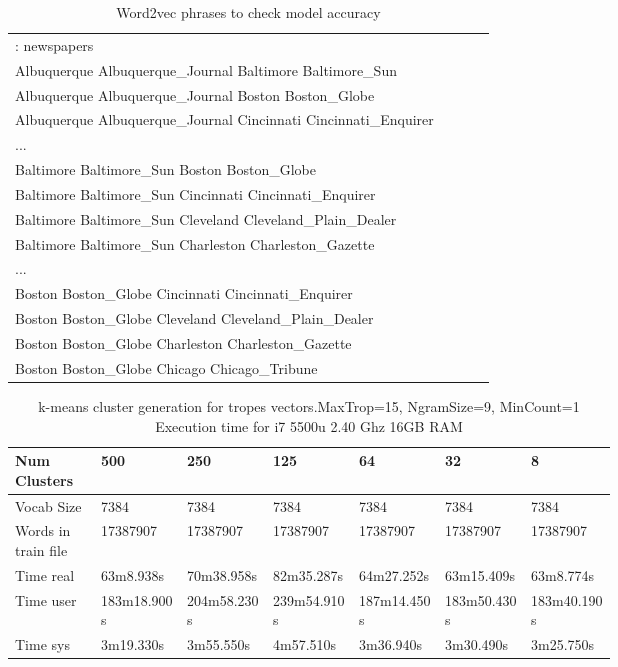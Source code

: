 \documentclass[letterpaper]{article}
\begin{document}
\begin{table}[ht]
	\centering
	\begin{tabular}{|p{0.9\linewidth}|}
		\hline	  
	
: newspapers\\
Albuquerque Albuquerque\_Journal Baltimore Baltimore\_Sun\\
Albuquerque Albuquerque\_Journal Boston Boston\_Globe\\
Albuquerque Albuquerque\_Journal Cincinnati Cincinnati\_Enquirer\\
...\\
Baltimore Baltimore\_Sun Boston Boston\_Globe\\
Baltimore Baltimore\_Sun Cincinnati Cincinnati\_Enquirer\\
Baltimore Baltimore\_Sun Cleveland Cleveland\_Plain\_Dealer\\
Baltimore Baltimore\_Sun Charleston Charleston\_Gazette\\
...\\
Boston Boston\_Globe Cincinnati Cincinnati\_Enquirer\\
Boston Boston\_Globe Cleveland Cleveland\_Plain\_Dealer\\
Boston Boston\_Globe Charleston Charleston\_Gazette\\
Boston Boston\_Globe Chicago Chicago\_Tribune\\

  \hline
  	   	\end{tabular}
\caption{Word2vec phrases to check model accuracy}
\label{tab:k-means-clusters}
\end{table}	
	
	
	   	\begin{table}[ht]
	   	\centering
	   	\begin{tabular}{|p{0.1\linewidth}|p{0.1\linewidth}|p{0.1\linewidth}|p{0.1\linewidth}|p{0.1\linewidth}|p{0.1\linewidth}|p{0.1\linewidth}|}
	   		\hline
	   		\textbf{Num Clusters}& \textbf{500} & \textbf{250} & \textbf{125} & \textbf{64} & \textbf{32} & \textbf{8}\\
	   		\hline
	   		\hline
	   		Vocab Size& 7384 & 7384 & 7384 & 7384 & 7384 & 7384\\
	   		\hline
	   		Words in train file& 17387907 & 17387907 & 17387907 & 17387907 & 17387907 & 17387907\\
	   		\hline
	   		Time real&63m8.938s&70m38.958s&82m35.287s & 64m27.252s & 63m15.409s &  63m8.774s\\
	   		\hline
	   		Time user&183m18.900s&204m58.230s&239m54.910s&  187m14.450s & 183m50.430s& 183m40.190s\\
	   		\hline
	   		Time sys&3m19.330s&3m55.550s&4m57.510s& 3m36.940s& 3m30.490s & 3m25.750s\\
	   		\hline
	   		
	   	\end{tabular}
	   	\caption{k-means cluster generation for tropes vectors.MaxTrop=15, NgramSize=9, MinCount=1 Execution time for i7 5500u 2.40 Ghz 16GB RAM}
	   	\label{tab:k-means-clusters}
	   \end{table}	
	  
\end{document}
